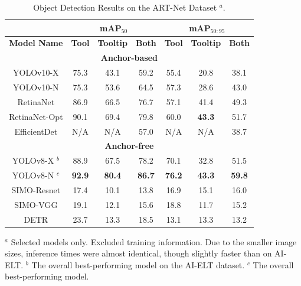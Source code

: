 \footnotesize
\begin{table}[htbp]
\centering
\caption{Object Detection Results on the ART-Net Dataset $^a$.}
\vspace*{-3mm}
\label{fig:artresults}
\begin{tabular}{|c|c|c|c|c|c|c|}
\hline
\multicolumn{1}{|c|}{} & \multicolumn{3}{c|}{\textbf{mAP$_{50}$}} & \multicolumn{3}{c|}{\textbf{mAP$_{50:95}$}} \\
\hline
\textbf{Model Name} & \textbf{Tool} & \textbf{Tooltip} & \textbf{Both} & \textbf{Tool} & \textbf{Tooltip} & \textbf{Both} \\ 
\hline
\multicolumn{7}{|c|}{\textbf{Anchor-based}} \\
\hline
YOLOv10-X & 75.3 & 43.1 & 59.2 & 55.4 & 20.8 & 38.1 \\
YOLOv10-N & 75.3 & 53.6 & 64.5 & 57.3 & 28.6 & 43.0 \\
RetinaNet & 86.9 & 66.5 & 76.7 & 57.1 & 41.4 & 49.3 \\
RetinaNet-Opt & 90.1 & 69.4 & 79.8 & 60.0 & \textbf{43.3} & 51.7 \\
EfficientDet & N/A & N/A & 57.0 & N/A & N/A & 38.7 \\
\hline
\multicolumn{7}{|c|}{\textbf{Anchor-free}} \\
\hline
\rowcolor{pink} YOLOv8-X $^b$ & 88.9 & 67.5 & 78.2 & 70.1 & 32.8 & 51.5 \\
\rowcolor{yellow} YOLOv8-N $^c$ & \textbf{92.9} & \textbf{80.4} & \textbf{86.7} & \textbf{76.2} & \textbf{43.3} & \textbf{59.8} \\
SIMO-Resnet & 17.4 & 10.1 & 13.8 & 16.9 & 15.1 & 16.0 \\
SIMO-VGG & 19.1 & 12.1 & 15.6 & 18.8 & 11.7 & 15.2 \\
DETR & 23.7 & 13.3 & 18.5 & 13.1 & 13.3 & 13.2 \\
\hline
\end{tabular}
\newline
\scriptsize{$^a$ Selected models only. Excluded training information. Due to the smaller image sizes, inference times were almost identical, though slightly faster than on AI-ELT. $^b$ The overall best-performing model on the AI-ELT dataset. $^c$ The overall best-performing model.}
\vspace{-4mm}
\end{table}

